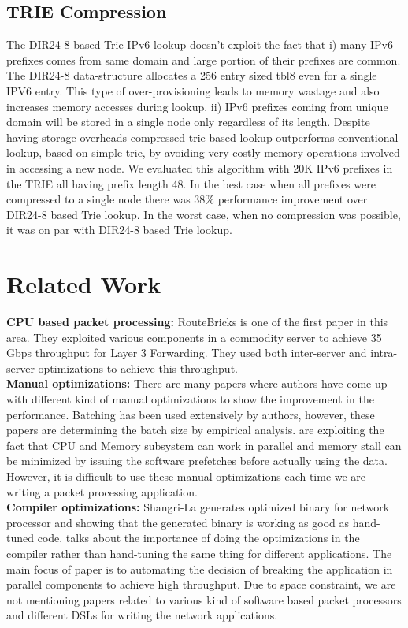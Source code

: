 \subsection{TRIE Compression}
The DIR24-8\cite{Gupta98routinglookups} based Trie IPv6 lookup doesn't exploit the fact that i) many IPv6 prefixes comes from same domain and large portion of their prefixes are common. The DIR24-8 data-structure allocates a 256 entry sized tbl8 even for a single IPV6 entry. This type of over-provisioning leads to memory wastage and also increases memory accesses during lookup. ii) IPv6 prefixes coming from unique domain will be stored in a single node only regardless of its length. Despite having storage overheads compressed trie based lookup outperforms conventional lookup, based on simple trie, by avoiding very costly memory operations involved in accessing a new node. We evaluated this algorithm with 20K IPv6 prefixes in the TRIE all having prefix length 48. In the best case when all prefixes were compressed to a single node there was 38\% performance improvement over DIR24-8 based Trie lookup. In the worst case, when no compression was possible, it was on par with DIR24-8 based Trie lookup.

\section{Related Work}
\label{relatedwork}
\textbf{CPU based packet processing:} RouteBricks\cite{dobrescu2009routebricks} is one of the first paper in this area. They exploited various components in a commodity server to achieve 35 Gbps throughput for Layer 3 Forwarding. They used both inter-server and intra-server optimizations to achieve this throughput.
\\
\textbf{Manual optimizations:} There are many papers where authors have come up with different kind of manual optimizations to show the improvement in the performance. Batching\cite{dobrescu2009routebricks, 189006, Kim:2012:PBC:2349896.2349910, Zhou:2013:SHP:2535372.2535379} has been used extensively by authors, however, these papers are determining the batch size by empirical analysis. \cite{189006, Zhou:2013:SHP:2535372.2535379} are exploiting the fact that CPU and Memory subsystem can work in parallel and memory stall can be minimized by issuing the software prefetches before actually using the data. However, it is difficult to use these manual optimizations each time we are writing a packet processing application.
\\
\textbf{Compiler optimizations:} Shangri-La \cite{Chen:2005:SAH:1065010.1065038} generates optimized binary for network processor and showing that the generated binary is working as good as hand-tuned code. \cite{Dobrescu:2010:CPM:1921151.1921154} talks about the importance of doing the optimizations in the compiler rather than hand-tuning the same thing for different applications. The main focus of paper \cite{Dobrescu:2010:CPM:1921151.1921154} is to automating the decision of breaking the application in parallel components to achieve high throughput.
Due to space constraint, we are not mentioning papers related to various kind of software based packet processors and different DSLs for writing the network applications.

